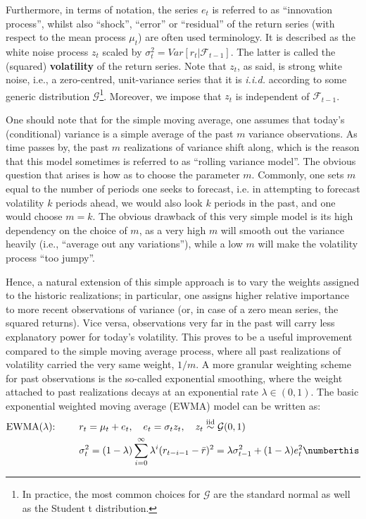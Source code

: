 Furthermore, in terms of notation, the series $e_t$ is referred to as \enquote{innovation process}, whilst also \enquote{shock}, \enquote{error} or \enquote{residual} of the return series (with respect to the mean process $\mu_t$) are often used terminology. It is described as the white noise process $z_t$ scaled by $\sigma_{t}^2 = Var[r_t | \mathcal{F}_{t-1} ]$. The latter is called the (squared) \textbf{volatility} of the return series. Note that $z_t$, as said, is strong white noise, i.e., a zero-centred, unit-variance series that it is \textit{i.i.d.} according to some generic distribution $\mathcal{G}$\footnote{In practice, the most common choices for $\mathcal{G}$ are the standard normal as well as the Student t distribution.}. Moreover, we impose that $z_t$ is independent of $\mathcal{F}_{t-1}$. 


One should note that for the simple moving average, one assumes that today's (conditional) variance is a simple average of the past $m$ variance observations. As time passes by, the past $m$ realizations of variance shift along,  which is the reason that this model sometimes is referred to as \enquote{rolling variance model}. The obvious question that arises is how as to choose the parameter $m$. Commonly, one sets $m$ equal to the number of periods one seeks to forecast, i.e. in attempting to forecast volatility $k$ periods ahead, we would also look $k$ periods in the past, and one would choose $m=k$. The obvious drawback of this very simple model is its high dependency on the choice of $m$, as a very high $m$ will smooth out the variance heavily (i.e., \enquote{average out any variations}), while a low $m$ will make the volatility process \enquote{too jumpy}.

Hence, a natural extension of this simple approach is to vary the weights assigned to the historic realizations; in particular, one assigns higher relative importance to more recent observations of variance (or, in case of a zero mean series, the squared returns). Vice versa, observations very far in the past will carry less explanatory power for today's volatility. This proves to be a useful improvement compared to the simple moving average process, where all past realizations of volatility carried the very same weight, $1/m$. A more granular weighting scheme for past observations is the so-called exponential smoothing, where the weight attached to past realizations decays at an exponential rate $\lambda \in (0,1) $. The basic exponential weighted moving average (EWMA) model can be written as:
\begin{align*}
\text{EWMA($\lambda$): }\qquad & r_t = \mu_{t} + e_{t}, \quad e_{t} = \sigma_{t} z_{t},\quad  z_{t} \overset{\text{iid}}{\sim} \mathcal{G}(0,1) \\
 & \sigma_t^2 = (1-\lambda) \sum_{i=0}^\infty \lambda^{i} (r_{t-i-1} - \bar{r})^2 = \lambda \sigma_{t-1}^2 + (1-\lambda)e_t^2 \numberthis \label{eq: EWMA}
\end{align*}

